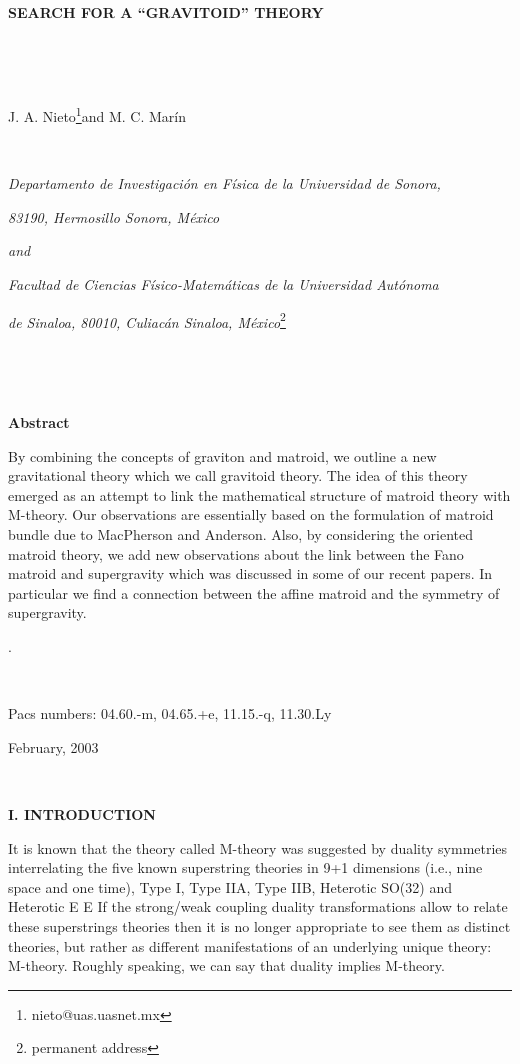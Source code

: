 \documentclass[a4paper,12pt]{article}
\begin{document}
\bigskip

\bigskip\ 

\begin{center}
\textbf{SEARCH FOR A ``GRAVITOID'' THEORY}

\bigskip\ 

\smallskip\ 

J. A. Nieto\footnote[1]{%
nieto@uas.uasnet.mx}and M. C. Mar\'{i}n

\smallskip\ 

\textit{Departamento de Investigaci\'{o}n en F\'{i}sica de la Universidad de
Sonora,}

\textit{83190, Hermosillo Sonora, M\'{e}xico}

\textit{and}

\textit{Facultad de Ciencias F\'{i}sico-Matem\'{a}ticas de la Universidad
Aut\'{o}noma}

\textit{de Sinaloa, 80010, Culiac\'{a}n Sinaloa, M\'{e}xico}\footnote[2]{%
permanent address}

\bigskip\ 

\bigskip\ 

\textbf{Abstract}
\end{center}

By combining the concepts of graviton and matroid, we outline a new
gravitational theory which we call gravitoid theory. The idea of this theory
emerged as an attempt to link the mathematical structure of matroid theory
with M-theory. Our observations are essentially based on the formulation of
matroid bundle due to MacPherson and Anderson. Also, by considering the
oriented matroid theory, we add new observations about the link between the
Fano matroid and \coordHE{} supergravity which was discussed in some of our
recent papers. In particular we find a connection between the affine matroid 
\coordHE{} and the \coordHE{}symmetry of \coordHE{} supergravity.

.\bigskip

\bigskip

\bigskip\ 

Pacs numbers: 04.60.-m, 04.65.+e, 11.15.-q, 11.30.Ly

February, 2003

\newpage\ 

\noindent \textbf{I. INTRODUCTION}

\bigskip

It is known that the theory called M-theory\coordHE{} was suggested by duality
symmetries interrelating the five known superstring theories\coordHE{} in 9+1
dimensions (i.e., nine space and one time), Type I, Type IIA, Type IIB,
Heterotic SO(32) and Heterotic E\coordHE{} E\coordHE{} If the strong/weak
coupling duality transformations allow to relate these superstrings theories
then it is no longer appropriate to see them as distinct theories, but
rather as different manifestations of an underlying unique theory: M-theory.
Roughly speaking, we can say that duality implies M-theory.
\end{document}
